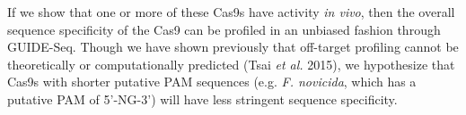 If we show that one or more of these Cas9s have activity \textit{in vivo}, then the overall sequence specificity of the Cas9 can be profiled in an unbiased fashion through GUIDE-Seq. Though we have shown previously that off-target profiling cannot be theoretically or computationally predicted (Tsai \textit{et al.} 2015), we hypothesize that Cas9s with shorter putative PAM sequences (e.g. \textit{F. novicida}, which has a putative PAM of 5'-NG-3') will have less stringent sequence specificity.